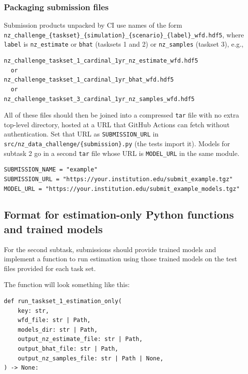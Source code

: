 \documentclass[11pt,twoside,letterpaper,onecolumn,english]{article}
\begin{document}
\subsubsection{Packaging submission files}

Submission products unpacked by CI use names of the form
\texttt{nz\_challenge\_\{taskset\}\_\{simulation\}\_\{scenario\}\_\{label\}\_wfd.hdf5},
where \texttt{label} is \texttt{nz\_estimate} or \texttt{bhat} (tasksets 1 and 2) or
\texttt{nz\_samples} (taskset 3), e.g.,

\begin{verbatim}
nz_challenge_taskset_1_cardinal_1yr_nz_estimate_wfd.hdf5
  or
nz_challenge_taskset_1_cardinal_1yr_bhat_wfd.hdf5
  or
nz_challenge_taskset_3_cardinal_1yr_nz_samples_wfd.hdf5
\end{verbatim}

All of these files should then be joined into a compressed \texttt{tar} file
with no extra top-level directory, hosted at a URL that GitHub Actions
can fetch without authentication.  Set that URL as \texttt{SUBMISSION\_URL} in
\texttt{src/nz\_data\_challenge/\{submission\}.py} (the tests import it). Models
for subtask 2 go in a second \texttt{tar} file whose URL is \texttt{MODEL\_URL} in
the same module.

\begin{verbatim}
SUBMISSION_NAME = "example"
SUBMISSION_URL = "https://your.institution.edu/submit_example.tgz"
MODEL_URL = "https://your.institution.edu/submit_example_models.tgz"
\end{verbatim}


\subsection{Format for estimation-only Python functions and trained models}

For the second subtask, submissions should provide trained models and
implement a function to run estimation using those trained models on
the test files provided for each task set.

The function will look something like this:

\begin{verbatim}
def run_taskset_1_estimation_only(
    key: str,
    wfd_file: str | Path,
    models_dir: str | Path,
    output_nz_estimate_file: str | Path,
    output_bhat_file: str | Path,
    output_nz_samples_file: str | Path | None,    
) -> None:    
\end{verbatim}
\end{document}
